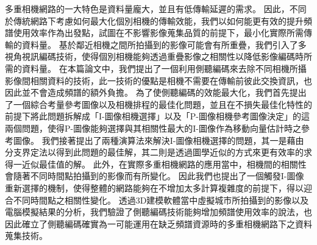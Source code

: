 {
多重相機網路的一大特色是資料量龐大，並且有低傳輸延遲的需求。
因此，不同於傳統網路下考慮如何最大化個別相機的傳輸效能，我們以如何能更有效的提升頻譜使用效率作為出發點，試圖在不影響影像蒐集品質的前提下，最小化實際所需傳輸的資料量。
基於鄰近相機之間所拍攝到的影像可能會有所重疊，我們引入了多視角視訊編碼技術，使得個別相機能夠透過重疊影像之相關性以降低影像編碼時所需的資料量。
在本篇論文中，我們提出了一個利用側聽編碼來去除不同相機所攝影像間相關資料的技術，此一技術的優點是相機不需要在傳輸前彼此交換資訊，也因此並不會造成頻譜的額外負擔。
為了使側聽編碼的效能最大化，我們首先提出了一個綜合考量參考圖像以及相機排程的最佳化問題，並且在不損失最佳化特性的前提下將此問題拆解成「I-圖像相機選擇」以及「P-圖像相機參考圖像決定」的這兩個問題，使得P-圖像能夠選擇與其相關性最大的I-圖像作為移動向量估計時之參考圖像。
我們接著提出了兩種演算法來解決I-圖像相機選擇的問題，其一是藉由分支界定法以得到此問題的最佳解，其二則是透過圖學近似的方式來更有效率的求得一近似最佳值的解。
此外，在實際多重相機網路的應用當中，相機間的相關性會隨著不同時間點拍攝到的影像而有所變化。
因此我們也提出了一個觸發I-圖像重新選擇的機制，使得整體的網路能夠在不增加太多計算複雜度的前提下，得以迎合不同時間點之相關性變化。
透過3D建模軟體當中虛擬城市所拍攝到的影像以及電腦模擬結果的分析，我們驗證了側聽編碼技術能夠增加頻譜使用效率的說法，也因此確立了側聽編碼確實為一可能運用在缺乏頻譜資源時的多重相機網路下之資料蒐集技術。}